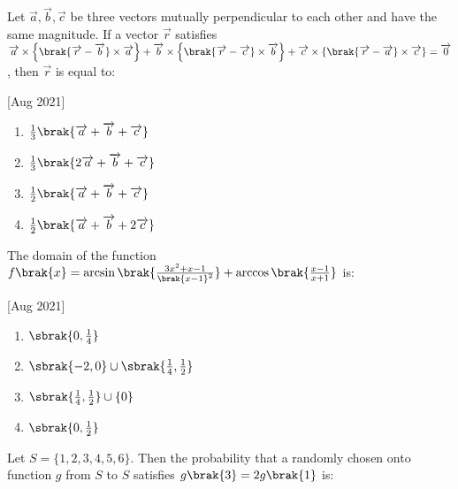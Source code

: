     \item Let $\overrightarrow{a},\overrightarrow{b},\overrightarrow{c}$ be three vectors mutually perpendicular to each other and have the same magnitude. If a vector $\overrightarrow{r}$ satisfies 
    $\overrightarrow{a}\times\left\{ \brak{\overrightarrow{r}-\overrightarrow{b}}\times\overrightarrow{a} \right\} + \overrightarrow{b}\times\left\{ \brak{\overrightarrow{r}-\overrightarrow{c}}\times\overrightarrow{b} \right\} + \overrightarrow{c}\times\left\{ \brak{\overrightarrow{r}-\overrightarrow{a}}\times\overrightarrow{c} \right\} = \overrightarrow{0}$, then $\overrightarrow{r}$ is equal to:
    
    \hfill[Aug 2021]

		\begin{multicols}{4}
			\begin{enumerate}
				\item $\frac{1}{3}\brak{\overrightarrow{a}+\overrightarrow{b}+\overrightarrow{c}}$
				\item $\frac{1}{3}\brak{2\overrightarrow{a}+\overrightarrow{b}+\overrightarrow{c}}$
				\item $\frac{1}{2}\brak{\overrightarrow{a}+\overrightarrow{b}+\overrightarrow{c}}$
				\item $\frac{1}{2}\brak{\overrightarrow{a}+\overrightarrow{b}+2\overrightarrow{c}}$
			\end{enumerate}
		\end{multicols}

    \item The domain of the function $f\brak{x}=\arcsin\brak{\frac{3x^2+x-1}{\brak{x-1}^2}}+\arccos\brak{\frac{x-1}{x+1}}$ is:
    
    \hfill[Aug 2021]

        \begin{multicols}{4}
            \begin{enumerate}
                \item $\sbrak{0, \frac{1}{4}}$
                \item $\sbrak{-2,0}\cup\sbrak{\frac{1}{4}, \frac{1}{2}}$
                \item $\sbrak{\frac{1}{4}, \frac{1}{2}}\cup\{0\}$
                \item $\sbrak{0, \frac{1}{2}}$
            \end{enumerate}
        \end{multicols}

    \item Let $S=\{1,2,3,4,5,6\}$. Then the probability that a randomly chosen onto function $g$ from $S$ to $S$ satisfies $g\brak{3}=2g\brak{1}$ is:
    
